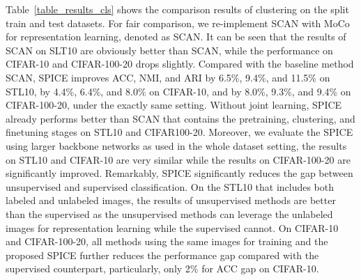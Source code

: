 \documentclass[journal]{IEEEtran}
\begin{document}
Table~\ref{table_results_cls} shows the comparison results of clustering on the split train and test datasets.
For fair comparison, we re-implement SCAN with MoCo~\cite{He_2020_CVPR} for representation learning, denoted as SCAN.
It can be seen that the results of SCAN on SLT10 are obviously better than SCAN, while the performance on CIFAR-10 and CIFAR-100-20 drops slightly.
Compared with the baseline method SCAN, SPICE improves ACC, NMI, and ARI by 6.5\%, 9.4\%, and 11.5\% on STL10, by 4.4\%, 6.4\%, and 8.0\% on CIFAR-10, and by 8.0\%, 9.3\%, and 9.4\% on CIFAR-100-20, under the exactly same setting.
Without joint learning, SPICE already performs better than SCAN that contains the pretraining, clustering, and finetuning stages on STL10 and CIFAR100-20.
Moreover, we evaluate the SPICE using larger backbone networks as used in the whole dataset setting, the results on STL10 and CIFAR-10 are very similar while the results on CIFAR-100-20 are significantly improved.
Remarkably, SPICE significantly reduces the gap between unsupervised and supervised classification. On the STL10 that includes both labeled and unlabeled images, the results of unsupervised methods are better than the supervised as the unsupervised methods can leverage the unlabeled images for representation learning while the supervised cannot.
On CIFAR-10 and CIFAR-100-20, all methods using the same images for training and the proposed SPICE further reduces the performance gap compared with the supervised counterpart, particularly, only 2\% for ACC gap on CIFAR-10.
\end{document}
